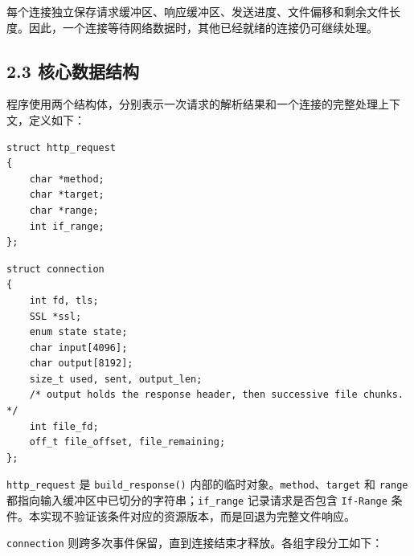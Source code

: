 \documentclass[UTF8,11pt,a4paper,fontset=fandol]{ctexart}
\begin{document}
每个连接独立保存请求缓冲区、响应缓冲区、发送进度、文件偏移和剩余文件长度。因此，一个连接等待网络数据时，其他已经就绪的连接仍可继续处理。


\subsection*{2.3 核心数据结构}

程序使用两个结构体，分别表示一次请求的解析结果和一个连接的完整处理上下文，定义如下：


\Needspace{90pt}
\noindent\begin{minipage}{\linewidth}
\begin{lstlisting}
struct http_request
{
	char *method;
	char *target;
	char *range;
	int if_range;
};
\end{lstlisting}
\end{minipage}
\par

\Needspace{140pt}
\noindent\begin{minipage}{\linewidth}
\begin{lstlisting}
struct connection
{
	int fd, tls;
	SSL *ssl;
	enum state state;
	char input[4096];
	char output[8192];
	size_t used, sent, output_len;
	/* output holds the response header, then successive file chunks. */
	int file_fd;
	off_t file_offset, file_remaining;
};
\end{lstlisting}
\end{minipage}
\par

\texttt{http\_\allowbreak{}request} 是 \texttt{build\_\allowbreak{}response(\allowbreak{})\allowbreak{}} 内部的临时对象。\texttt{method}、\texttt{target} 和 \texttt{range} 都指向输入缓冲区中已切分的字符串；\texttt{if\_\allowbreak{}range} 记录请求是否包含 \texttt{If-Range} 条件。本实现不验证该条件对应的资源版本，而是回退为完整文件响应。


\texttt{connection} 则跨多次事件保留，直到连接结束才释放。各组字段分工如下：
\end{document}
